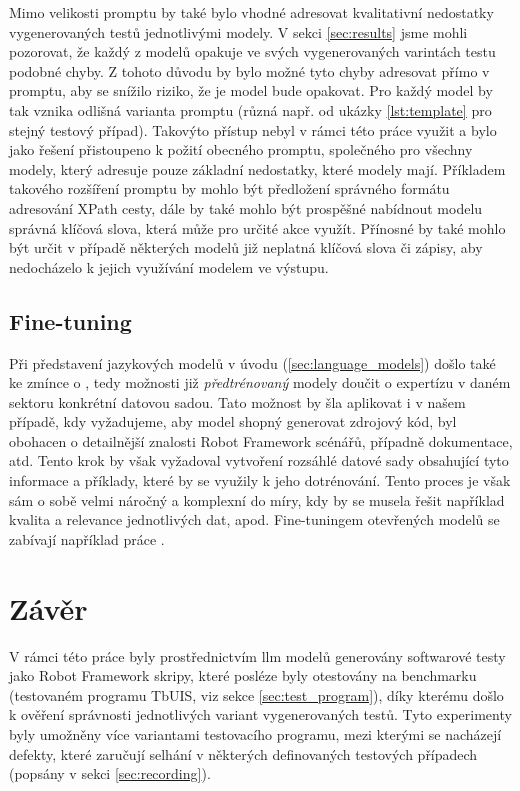 \documentclass[czech, ma, kiv, he, iso690numb, pdf, viewonly]{fasthesis}
\begin{document}
    Mimo velikosti promptu by také bylo vhodné adresovat kvalitativní nedostatky vygenerovaných testů jednotlivými modely. V sekci \ref{sec:results} jsme mohli pozorovat, že každý z modelů opakuje ve svých vygenerovaných varintách testu podobné chyby. Z tohoto důvodu by bylo možné tyto chyby adresovat přímo v promptu, aby se snížilo riziko, že je model bude opakovat. Pro každý model by tak vznika odlišná varianta promptu (různá např. od ukázky \ref{lst:template} pro stejný testový případ). Takovýto přístup nebyl v rámci této práce využit a bylo jako řešení přistoupeno k požití obecného promptu, společného pro všechny modely, který adresuje pouze základní nedostatky, které modely mají. Příkladem takového rozšíření promptu by mohlo být předložení správného formátu adresování XPath cesty, dále by také mohlo být prospěšné nabídnout modelu správná klíčová slova, která může pro určité akce využít. Přínosné by také mohlo být určit v případě některých modelů již neplatná klíčová slova či zápisy, aby nedocházelo k jejich využívání modelem ve výstupu.

    \section{Fine-tuning}

    Při představení jazykových modelů v úvodu (\ref{sec:language_models}) došlo také ke zmínce o , tedy možnosti již \textit{předtrénovaný} modely doučit o expertízu v daném sektoru konkrétní datovou sadou. Tato možnost by šla aplikovat i v našem případě, kdy vyžadujeme, aby model shopný generovat zdrojový kód, byl obohacen o detailnější znalosti Robot Framework scénářů, případně dokumentace, atd. Tento krok by však vyžadoval vytvoření rozsáhlé datové sady obsahující tyto informace a příklady, které by se využily k jeho dotrénování. Tento proces je však sám o sobě velmi náročný a komplexní do míry, kdy by se musela řešit například kvalita a relevance jednotlivých dat, apod. Fine-tuningem otevřených modelů se zabívají například práce \cite{weyssow2024exploring, shi2024deep}.

\chapter{Závěr}
    
    V rámci této práce byly prostřednictvím \Gls{llm} modelů generovány softwarové testy jako Robot Framework skripy, které posléze byly otestovány na benchmarku (testovaném programu TbUIS, viz sekce \ref{sec:test_program}), díky kterému došlo k ověření správnosti jednotlivých variant vygenerovaných testů. Tyto experimenty byly umožněny více variantami testovacího programu, mezi kterými se nacházejí defekty, které zaručují selhání v některých definovaných testových případech (popsány v sekci \ref{sec:recording}). 
\end{document}
